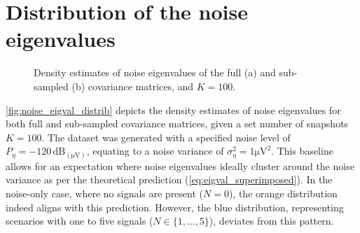 \section{Distribution of the noise eigenvalues}
\label{app:sec:NoiseEigvalDistrib}
\begin{figure}[H]
    \centering
    \caption{Density estimates of noise eigenvalues of the full (a) and sub-sampled (b) covariance matrices, and \( K = 100 \).}
    \label{fig:noise_eigval_distrib}
\end{figure}

\autoref{fig:noise_eigval_distrib} depicts the density estimates of noise eigenvalues for both full and sub-sampled
covariance matrices, given a set number of snapshots \( K = 100 \).
The dataset was generated with a specified noise level of \( P_\eta = -120 \, \si{\deci\bel}_{(\si{\micro\volt})} \),
equating to a noise variance of \( \sigma^2_\eta = 1 \si{\micro\volt\squared} \). This baseline allows for an expectation
where noise eigenvalues ideally cluster around the noise variance as per the theoretical prediction (\autoref{eq:eigval_superimposed}).
In the noise-only case, where no signals are present (\( N = 0 \)), the orange distribution indeed aligns with this prediction.
However, the blue distribution, representing scenarios with one to five signals (\( N \in \{1, \ldots, 5\} \)), deviates
from this pattern.

